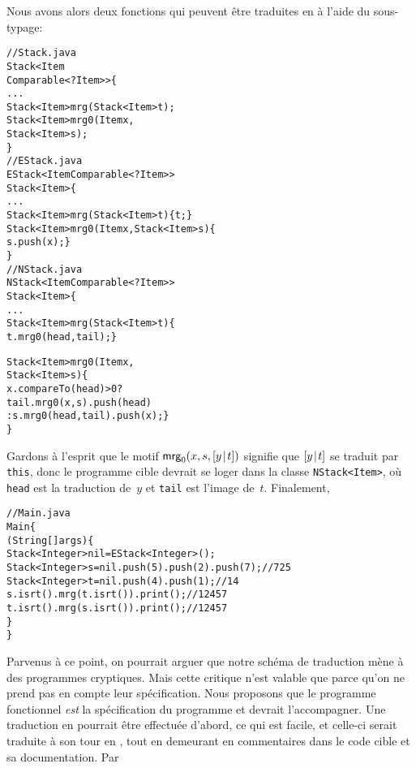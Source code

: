 Nous avons alors deux fonctions qui peuvent être traduites en \Java à
l'aide du sous-typage:
\begin{alltt}
// Stack.java
\public \abstractX \class Stack<Item
\hfill\extends Comparable<? \super Item>> \{
  ...
  \public \abstractX Stack<Item> mrg(\final Stack<Item> t);
  \public \abstractX Stack<Item> mrg0(\final Item x,
                                   \final Stack<Item> s);
\}
// EStack.java
\public \class EStack<Item \extends Comparable<? \super Item>> 
       \extends Stack<Item> \{
  ...
  \public Stack<Item> mrg(\final Stack<Item> t) \{ \return t; \}
  \public Stack<Item> mrg0(\final\! Item x,\final Stack<Item> s)\{
    \return s.push(x); \}
\}
// NStack.java
\public \class NStack<Item \extends Comparable<? \super Item>>
       \extends Stack<Item> \{
  ...
  \public Stack<Item> mrg(\final Stack<Item> t) \{
    \return t.mrg0(head,tail); \}

  \public Stack<Item> mrg0(\final Item x,
                          \final Stack<Item> s) \{
    \return x.compareTo(head) > 0 ?
           tail.mrg0(x,s).push(head)
         : s.mrg0(head,tail).push(x); \}
\}
\end{alltt}
Gardons à l'esprit que le motif \(\textsf{mrg}_0(x,s,[{y}\!\mid\!{t}])\)
signifie que \([{y}\!\mid\!{t}]\) se traduit par \texttt{this}, donc le
programme cible devrait se loger dans la classe \texttt{NStack<Item>},
où \texttt{head} est la traduction de~\(y\) et \texttt{tail} est
l'image de~\(t\). Finalement,
\begin{alltt}
// Main.java
\public \class Main \{
  \public \static \void \main (String[] args) \{
    Stack<Integer> nil = \new EStack<Integer>();
    Stack<Integer> s = nil.push(5).push(2).push(7);\hfill// 7 2 5
    Stack<Integer> t = nil.push(4).push(1);\hfill// 1 4
    s.isrt().mrg(t.isrt()).print();\hfill// 1 2 4 5 7
    t.isrt().mrg(s.isrt()).print();\hfill// 1 2 4 5 7
  \}
\}
\end{alltt}
Parvenus à ce point, on pourrait arguer que notre schéma de traduction
mène à des programmes \Java cryptiques. Mais cette critique n'est
valable que parce qu'on ne prend pas en compte leur
spécification. Nous proposons que le programme fonctionnel \emph{est}
la spécification du programme \Java et devrait l'accompagner. Une
traduction en \Erlang pourrait être effectuée d'abord, ce qui est
facile, et celle-ci serait traduite à son tour en \Java, tout en
demeurant en commentaires dans le code cible et sa documentation. Par
